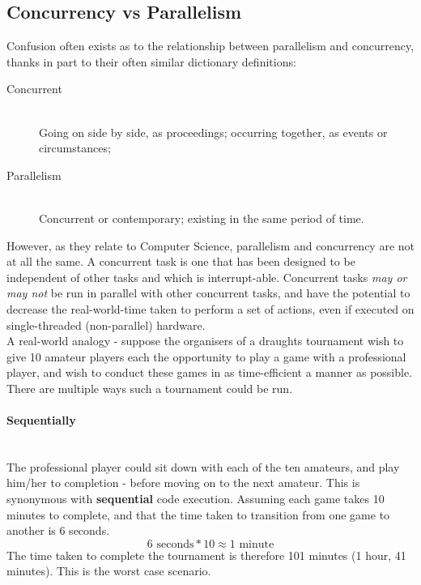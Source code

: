 \subsection{Concurrency vs Parallelism}
\label{sub:concurrencyparallelism}

Confusion often exists as to the relationship between parallelism and
concurrency, thanks in part to their often similar dictionary definitions:

\begin{description}
  \item[Concurrent] \hfill \\ Going on side by side, as proceedings; occurring
  together, as events or circumstances;\cite{oed}
  \item[Parallelism] \hfill \\ Concurrent or contemporary; existing in the same
  period of time.\cite{oed}
\end{description}

However, as they relate to Computer Science, parallelism and concurrency are not
at all the same. A concurrent task is one that has been designed to be
independent of other tasks and which is interrupt-able. Concurrent tasks
\emph{may or may not} be run in parallel with other concurrent tasks, and have
the potential to decrease the real-world-time taken to perform a set of actions,
even if executed on single-threaded (non-parallel) hardware. \\

A real-world analogy - suppose the organisers of a draughts tournament wish to
give 10 amateur players each the opportunity to play a game with a professional
player, and wish to conduct these games in as time-efficient a manner as
possible. There are multiple ways such a tournament could be run. \\

\paragraph{Sequentially} \mbox{}\\

The professional player could sit down with each of the ten amateurs, and play
him/her to completion - before moving on to the next amateur. This is synonymous
with \textbf{sequential} code execution. Assuming each game takes 10 minutes to
complete, and that the time taken to transition from one game to another is 6
seconds. $$6 \text{ seconds} * 10 \approx 1 \text{ minute}$$
The time taken to complete the tournament is therefore 101 minutes (1 hour, 41
minutes). This is the worst case scenario. \\

